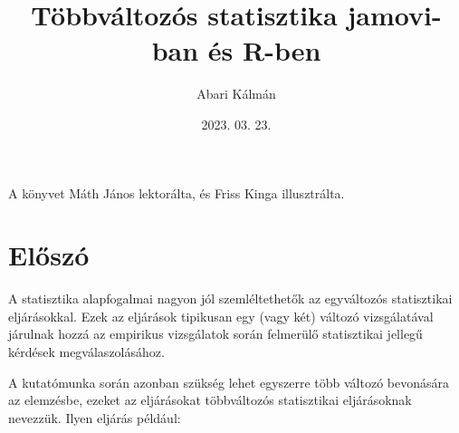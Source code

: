 \documentclass[
  letterpaper,
]{krantz}
\title{Többváltozós statisztika jamovi-ban és R-ben}
\author{Abari Kálmán}
\date{2023. 03. 23.}
\renewcommand*\contentsname{Tartalomjegyzék}
\newcommand\contentsname{Tartalomjegyzék}
\begin{document}
\maketitle

\thispagestyle{empty}

\begin{center}
A könyvet Máth János lektorálta, és Friss Kinga illusztrálta.
\end{center}

\setlength{\abovedisplayskip}{-5pt}
\setlength{\abovedisplayshortskip}{-5pt}


\ifdefined\Shaded\renewenvironment{Shaded}{\begin{tcolorbox}[enhanced, boxrule=0pt, borderline west={3pt}{0pt}{shadecolor}, interior hidden, breakable, frame hidden, sharp corners]}{\end{tcolorbox}}\fi

\renewcommand*\contentsname{Tartalomjegyzék}
{
\hypersetup{linkcolor=}
\setcounter{tocdepth}{2}
\tableofcontents
}
\listoffigures
\listoftables
{}

\hypertarget{sec-eloszo}{%
\chapter*{Előszó}\label{sec-eloszo}}


A statisztika alapfogalmai nagyon jól szemléltethetők az egyváltozós
statisztikai eljárásokkal. Ezek az eljárások tipikusan egy (vagy két)
változó vizsgálatával járulnak hozzá az empirikus vizsgálatok során
felmerülő statisztikai jellegű kérdések megválaszolásához.

A kutatómunka során azonban szükség lehet egyszerre több változó
bevonására az elemzésbe, ezeket az eljárásokat többváltozós statisztikai
eljárásoknak nevezzük. Ilyen eljárás például:
\end{document}
